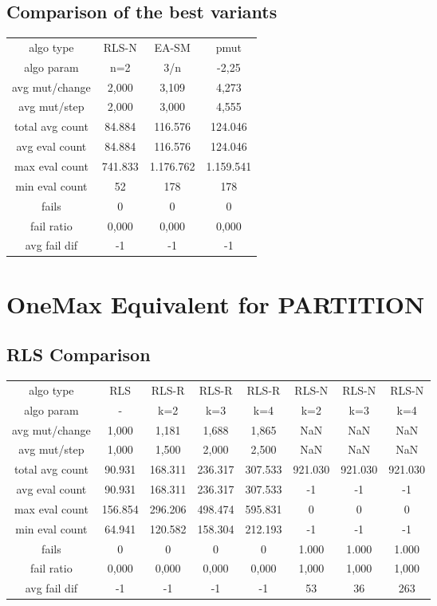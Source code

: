 \subsection{Comparison of the best variants}
\begin{tabular}[h]{cccc}
algo type&            RLS-N&     EA-SM&      pmut\\
algo param&             n=2&       3/n&     -2,25\\
avg mut/change&       2,000&     3,109&     4,273\\
avg mut/step&         2,000&     3,000&     4,555\\
\hline
total avg count&     84.884&   116.576&   124.046\\
avg eval count&      84.884&   116.576&   124.046\\
max eval count&     741.833& 1.176.762& 1.159.541\\
min eval count&          52&       178&       178\\
\hline
fails&                    0&         0&         0\\
fail ratio&           0,000&     0,000&     0,000\\
avg fail dif&            -1&        -1&        -1\\
\end{tabular}
\section{OneMax Equivalent for PARTITION}
\subsection{RLS Comparison}
\begin{tabular}[h]{cccccccc}
algo type&            RLS&   RLS-R&   RLS-R&   RLS-R&   RLS-N&   RLS-N&   RLS-N\\
algo param&             -&     k=2&     k=3&     k=4&     k=2&     k=3&     k=4\\
avg mut/change&     1,000&   1,181&   1,688&   1,865&     NaN&     NaN&     NaN\\
avg mut/step&       1,000&   1,500&   2,000&   2,500&     NaN&     NaN&     NaN\\
\hline
total avg count&   90.931& 168.311& 236.317& 307.533& 921.030& 921.030& 921.030\\
avg eval count&    90.931& 168.311& 236.317& 307.533&      -1&      -1&      -1\\
max eval count&   156.854& 296.206& 498.474& 595.831&       0&       0&       0\\
min eval count&    64.941& 120.582& 158.304& 212.193&      -1&      -1&      -1\\
\hline
fails&                  0&       0&       0&       0&   1.000&   1.000&   1.000\\
fail ratio&         0,000&   0,000&   0,000&   0,000&   1,000&   1,000&   1,000\\
avg fail dif&          -1&      -1&      -1&      -1&      53&      36&     263\\
\end{tabular}
